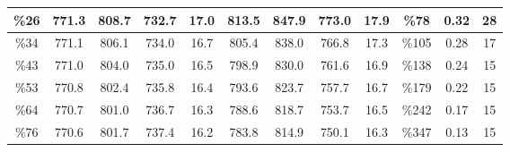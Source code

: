 \documentclass[12pt]{article}
\begin{document}
\begin{table}
{\begin{tabular}{|c|c|c|c|c|c|c|c|c|c|c|c|}
\%26                                                                                               & 771.3         & 808.7        & 732.7        & 17.0            & 813.5         & 847.9        & 773.0        & 17.9            & \%78                                                                                          & 0.32      &28                                                                                    \\ \hline
\%34                                                                                               & 771.1         & 806.1        & 734.0        & 16.7            & 805.4         & 838.0        & 766.8        & 17.3            & \%105                                                                                         & 0.28  &17                                                                                                \\ \hline
\%43                                                                                               & 771.0         & 804.0        & 735.0        & 16.5            & 798.9         & 830.0        & 761.6        & 16.9            & \%138                                                                                         & 0.24     &15                                                                                             \\ \hline
\%53                                                                                               & 770.8         & 802.4        & 735.8        & 16.4            & 793.6         & 823.7        & 757.7        & 16.7            & \%179                                                                                         & 0.22        &15                                                                                          \\ \hline
\%64                                                                                               & 770.7         & 801.0        & 736.7        & 16.3            & 788.6         & 818.7        & 753.7        & 16.5            & \%242                                                                                         & 0.17           &15                                                                                    \\ \hline
\%76                                                                                               & 770.6         & 801.7        & 737.4        & 16.2            & 783.8         & 814.9        & 750.1        & 16.3            & \%347                                                                                         & 0.13              &15                                                                                    \\ \hline

\end{tabular}}
\end{table}
\end{document}
